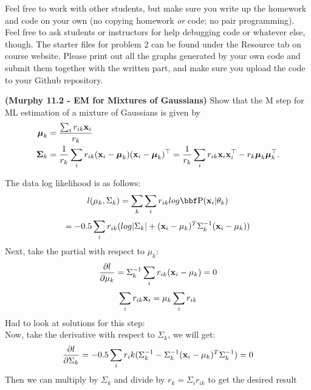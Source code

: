 \documentclass[12pt,letterpaper,fleqn]{hmcpset}
\begin{document}
Feel free to work with other students, but make sure you write up the homework
and code on your own (no copying homework \textit{or} code; no pair programming).
Feel free to ask students or instructors for help debugging code or whatever else,
though.
\newline
\newline
The starter files for problem 2 can be found under the Resource tab on course website. Please print out all the graphs generated by your own code and submit them together with the written part, and make sure you upload the code to your Github repository.\\

\begin{problem}[1]
\textbf{(Murphy 11.2 - EM for Mixtures of Gaussians)} Show that the M step for ML
estimation of a mixture of Gaussians is given by
\begin{align*}
    \hbox{\boldmath$\mu$}_k &= \frac{\sum_i r_{ik}{\bf x}_i}{r_k}\\
    \hbox{\boldmath$\Sigma$}_k &= \frac{1}{r_k}\sum_i r_{ik}({\bf x}_i - \hbox{\boldmath$\mu$}_k)({\bf x}_i - \hbox{\boldmath$\mu$}_k)^\top = \frac{1}{r_k}\sum_i r_{ik}{\bf x}_i{\bf x}_i^\top - r_k\hbox{\boldmath$\mu$}_k\hbox{\boldmath$\mu$}_k^\top.
\end{align*}
\end{problem}
\begin{solution}
The data log likelihood is as follows: \[
l(\mu_k, \Sigma_k) = \sum_k \sum_i r_{ik} log \PP(\xx_i|\theta_k) \]
\[
= -0.5 \sum_i r_{ik} (log |\Sigma_k| + ({\bf x}_i - \mu_k)^T \Sigma_k^{-1}({\bf x}_i - \mu_k))
\]
Next, take the partial with respect to $\mu_k: $ \[
\frac{\partial l}{\partial \mu_k} = \Sigma_k^{-1} \sum_i r_{ik} ({\bf x}_i - \mu_k) = 0 
\]
\[ \sum_i r_{ik}{\bf x}_i = \mu_k \sum_i r_{ik} \]
Had to look at solutions for this step: \\
Now, take the derivative with respect to $\Sigma_k$, we will get: \\
\[ \frac{\partial l}{\partial \Sigma_k} = -0.5 \sum_i r_ik (\Sigma_k^{-1} - \Sigma_k^{-1}({\bf x}_i - \mu_k)^T \Sigma_k^{-1}) = 0 \]
Then we can multiply by $\Sigma_k$ and divide by $r_k = \Sigma_i r_{ik} $ to get the desired result
\end{solution}
\newpage
\end{document}
